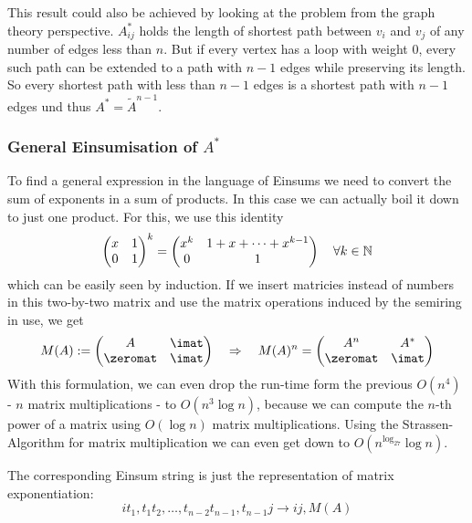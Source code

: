 This result could also be achieved by looking at the problem from the graph theory perspective. $A^*_{ij}$ holds the length of shortest path between $v_i$ and $v_j$ of any number of edges less than $n$. But if every vertex has a loop with weight 0, every such path can be extended to a path with $n-1$ edges while preserving its length. So every shortest path with less than $n-1$ edges is a shortest path with $n-1$ edges und thus $A^* = \tilde A^{n-1}$.

\subsubsection{General Einsumisation of $A^*$}
To find a general expression in the language of Einsums we need to convert the sum of exponents in a sum of products. In this case we can actually boil it down to just one product. For this, we use this identity
$$\left(\begin{matrix}
    x & 1\\
    0 & 1
\end{matrix}\right)^k = \left(\begin{matrix}
    x^k & 1 + x + \dots + x^{k-1} \\
    0 & 1
\end{matrix}\right) \quad \forall k \in \mathbb{N}$$
which can be easily seen by induction. If we insert matricies instead of numbers in this two-by-two matrix and use the matrix operations induced by the semiring in use, we get
$$M(A) := \left(\begin{matrix}
    A & \imat\\
    \zeromat & \imat
\end{matrix}\right) \quad\Rightarrow\quad M(A)^n = \left(\begin{matrix}
    A^n & A^* \\
    \zeromat & \imat
\end{matrix}\right)$$
With this formulation, we can even drop the run-time form the previous $O(n^4)$ - $n$ matrix multiplications - to $O(n^3 \log n)$, because we can compute the $n$-th power of a matrix using $O(\log n)$ matrix multiplications. Using the Strassen-Algorithm for matrix multiplication we can even get down to $O(n^{\log_27}\log n)$.

The corresponding Einsum string is just the representation of matrix exponentiation:
$$it_1,t_1t_2,\dots, t_{n-2}t_{n-1},t_{n-1}j \rightarrow ij, M(A)$$


